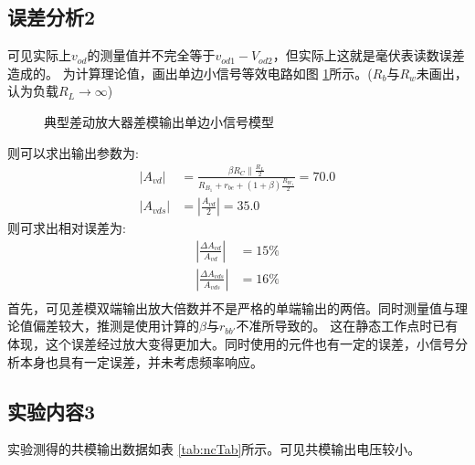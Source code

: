 \documentclass[a4paper,11pt,UTF8]{ctexart}
\begin{document}
\subsection{误差分析2}
可见实际上$v_{od}$的测量值并不完全等于$v_{od1}-V_{od2}$，但实际上这就是毫伏表读数误差造成的。
为计算理论值，画出单边小信号等效电路如图 \ref{fig:ndSmallSignal}所示。($R_b$与$R_w$未画出，认为负载$R_L\rightarrow\infty$)
\begin{figure}[htbp]
  \centering
  \caption{典型差动放大器差模输出单边小信号模型}
  \label{fig:ndSmallSignal}
  \end{figure}
则可以求出输出参数为:
\begin{equation}
  \begin{aligned}
    \left | A_{vd}\right |&=\frac{\beta R_C\parallel\frac{R_L}{2}}{R_{B_1}+r_{be}+(1+\beta)\frac{R_{W_1}}{2}}=70.0\\
    \left | A_{vds}\right |&=\left |\frac{A_{vd}}{2}\right |=35.0
  \end{aligned}
\end{equation}
则可求出相对误差为:
\begin{equation}
  \begin{aligned}
    \left |\frac{\Delta A_{vd}}{A_{vd}}\right |&=15\%\\
      \left |\frac{\Delta A_{vds}}{A_{vds}}\right |&=16\%\\
  \end{aligned}
\end{equation}
首先，可见差模双端输出放大倍数并不是严格的单端输出的两倍。同时测量值与理论值偏差较大，推测是使用计算的$\beta$与$r_{bb'}$不准所导致的。
这在静态工作点时已有体现，这个误差经过放大变得更加大。同时使用的元件也有一定的误差，小信号分析本身也具有一定误差，并未考虑频率响应。
\subsection{实验内容3}
实验测得的共模输出数据如表 \ref{tab:ncTab}所示。可见共模输出电压较小。
\end{document}
